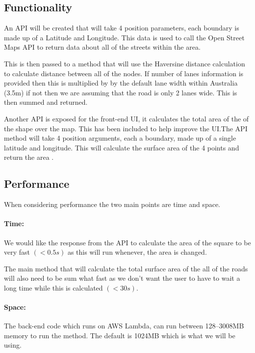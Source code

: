 \documentclass[a4paper,11pt]{article}
\begin{document}
\subsection{Functionality}

An API will be created that will take 4 position parameters, each boundary is
made up of a Latitude and Longitude. This data is used to call the  Open Street
Maps API \autocite{osm:14} to return data about all of the streets within the
area.

This is then passed to a method that will use the Haversine distance calculation
\autocite{hav:8} to calculate distance between all of the nodes. If number of
lanes information is provided then this is multiplied by by the default lane
width within Australia (3.5m) \autocite{lane:9} if not then we are assuming that
the road is only 2 lanes wide. This is then summed and returned.

Another API is exposed for the front-end UI, it calculates the total area of the
of the shape over the map. This has been included to help improve the UI.\@ The
API method will take 4 position arguments, each a boundary, made up of a single
latitude and longitude. This will calculate the surface area of the 4 points and
return the area \autocite{math:10}.

\subsection{Performance}

When considering performance the two main points are time and space.

\paragraph{Time:}

We would like the response from the API to calculate the area of the square to
be very fast $(< 0.5s)$ as this will run whenever, the area is changed.

The main method that will calculate the total surface area of the all of the
roads will also need to be sum what fast as we don't want the user to have to
wait a long time while this is calculated $(< 30s)$.

\paragraph{Space:}

The back-end code which runs on AWS Lambda, can run between 128--3008MB memory
to run the method. The default is 1024MB which is what we will be using.
\end{document}
